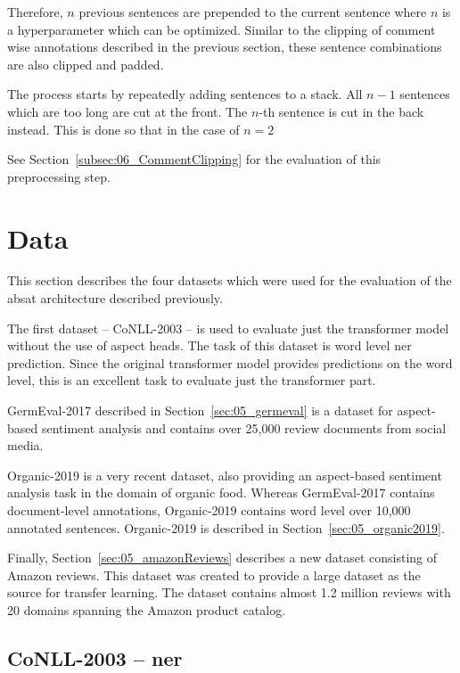Therefore, $n$ previous sentences are prepended to the current sentence where $n$ is a hyperparameter which can be optimized. Similar to the clipping of comment wise annotations described in the previous section, these sentence combinations are also clipped and padded. 
\medskip

The process starts by repeatedly adding sentences to a stack. All $n-1$ sentences which are too long are cut at the front. The $n$-th sentence is cut in the back instead. This is done so that in the case of $n=2$ 


See Section~\ref{subsec:06_CommentClipping} for the evaluation of this preprocessing step.

\section{Data}
\label{sec:05_Data}

This section describes the four datasets which were used for the evaluation of the \acrfull{absat} architecture described previously.

The first dataset -- CoNLL-2003 -- is used to evaluate just the transformer model without the use of aspect heads. The task of this dataset is word level \gls{ner} prediction. Since the original transformer model provides predictions on the word level, this is an excellent task to evaluate just the transformer part.
\medskip

GermEval-2017 described in Section~\ref{sec:05_germeval} is a dataset for aspect-based sentiment analysis and contains over 25,000 review documents from social media.
\medskip

Organic-2019 is a very recent dataset, also providing an aspect-based sentiment analysis task in the domain of organic food. Whereas GermEval-2017 contains document-level annotations, Organic-2019 contains word level over 10,000 annotated sentences. Organic-2019 is described in Section~\ref{sec:05_organic2019}.
\medskip

Finally, Section~\ref{sec:05_amazonReviews} describes a new dataset consisting of Amazon reviews. This dataset was created to provide a large dataset as the source for transfer learning. The dataset contains almost 1.2 million reviews with 20 domains spanning the Amazon product catalog.

\subsection{CoNLL-2003 -- \acrfull{ner}}

